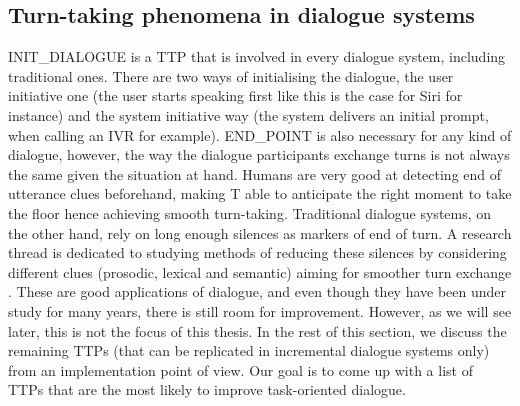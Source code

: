      \subsection{Turn-taking phenomena in dialogue systems}
		
          INIT\_DIALOGUE is a TTP that is involved in every dialogue system, including traditional ones. There are two ways of initialising the dialogue, the user initiative one (the user starts speaking first like this is the case for Siri for instance) and the system initiative way (the system delivers an initial prompt, when calling an IVR for example). END\_POINT is also necessary for any kind of dialogue, however, the way the dialogue participants exchange turns is not always the same given the situation at hand. Humans are very good at detecting end of utterance clues beforehand, making T able to anticipate the right moment to take the floor hence achieving smooth turn-taking. Traditional dialogue systems, on the other hand, rely on long enough silences as markers of end of turn. A research thread is dedicated to studying methods of reducing these silences by considering different clues (prosodic, lexical and semantic) aiming for smoother turn exchange \cite{Raux2008}. These are good applications of dialogue, and even though they have been under study for many years, there is still room for improvement. However, as we will see later, this is not the focus of this thesis. In the rest of this section, we discuss the remaining TTPs (that can be replicated in incremental dialogue systems only) from an implementation point of view. Our goal is to come up with a list of TTPs that are the most likely to improve task-oriented dialogue.

